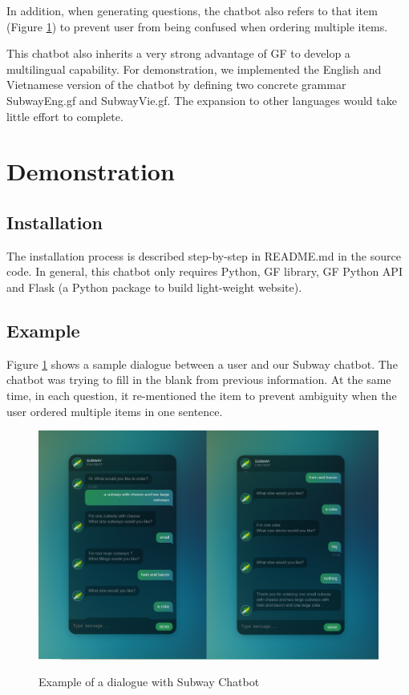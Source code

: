 \documentclass[12pt]{article}
\begin{document}
In addition, when generating questions, the chatbot also refers to that item (Figure \ref{fig:demo}) to prevent user from being confused when ordering multiple items.

This chatbot also inherits a very strong advantage of GF to develop a multilingual capability. For demonstration, we implemented the English and Vietnamese version of the chatbot by defining two concrete grammar SubwayEng.gf and SubwayVie.gf. The expansion to other languages would take little effort to complete.

\section{Demonstration}

\subsection{Installation} 
The installation process is described step-by-step in README.md in the source code. In general, this chatbot only requires Python, GF library, GF Python API and Flask (a Python package to build light-weight website).


\subsection{Example} 
Figure \ref{fig:demo} shows a sample dialogue between a user and our Subway chatbot. The chatbot was trying to fill in the blank from previous information. At the same time, in each question, it re-mentioned the item to prevent ambiguity when the user ordered multiple items in one sentence.
\begin{figure}[ht]
    \caption{Example of a dialogue with Subway Chatbot}
    \centering
	\includegraphics[width=\textwidth]{exported}
	\label{fig:demo}
\end{figure}
\end{document}
